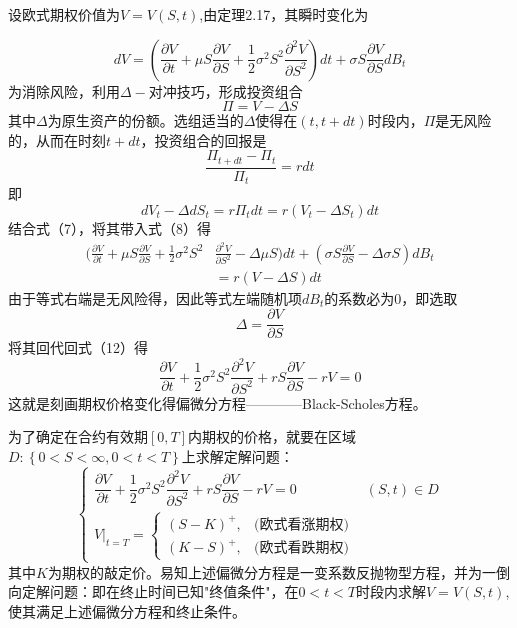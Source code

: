 \documentclass[UTF8，12pt]{ctexart}
\numberwithin{equation}{section}
\begin{document}
设欧式期权价值为$V=V(S,t)$,由定理2.17，其瞬时变化为

\begin{equation}
	dV=(\frac{\partial V}{\partial t}+\mu S\frac{\partial V}{\partial S}+\frac{1}{2}\sigma^2 S^2\frac{\partial^2 V}{\partial S^2})dt+\sigma S\frac{\partial V}{\partial S}dB_t
\end{equation}
为消除风险，利用$\Delta-$对冲技巧，形成投资组合
\begin{equation}
	\Pi=V-\Delta S
\end{equation}
其中$\Delta$为原生资产的份额。选组适当的$\Delta$使得在$(t,t+dt)$时段内，$\Pi$是无风险的，从而在时刻$t+dt$，投资组合的回报是
\begin{equation}
	\frac{\Pi_{t+dt}-\Pi_t}{\Pi_t}=rdt
\end{equation}
即
\begin{equation}
	dV_t-\Delta dS_t=r\Pi_t dt=r(V_t-\Delta S_t)dt
\end{equation}
结合式（7），将其带入式（8）得
\begin{equation}
	\begin{split}
		(\frac{\partial V}{\partial t}+\mu S\frac{\partial V}{\partial S}+\frac{1}{2}\sigma^2 S^2&\frac{\partial^2 V}{\partial S^2}-\Delta\mu S)dt+(\sigma S\frac{\partial V}{\partial S}-\Delta\sigma S)dB_t\\
		&=r(V-\Delta S)dt
	\end{split}
\end{equation}
由于等式右端是无风险得，因此等式左端随机项$dB_t$的系数必为0，即选取
\begin{equation}
	\Delta=\frac{\partial V}{\partial S}
\end{equation}
将其回代回式（12）得
\begin{equation}
	\frac{\partial V}{\partial t}+\frac{1}{2}\sigma^2 S^2\frac{\partial^2 V}{\partial S^2}+rS\frac{\partial V}{\partial S}-rV=0
\end{equation}
这就是刻画期权价格变化得偏微分方程————Black-Scholes方程。

为了确定在合约有效期$[0,T]$内期权的价格，就要在区域$D:\left\{0<S<\infty,0<t<T\right\}$上求解定解问题：
\[
\begin{cases}
	\dfrac{\partial V}{\partial t} + \dfrac{1}{2}\sigma^2 S^2 \dfrac{\partial^2 V}{\partial S^2} + rS \dfrac{\partial V}{\partial S} - rV = 0 & (S,t)\in D \\[10pt]
	V|_{t=T} = 
	\begin{cases}
		(S - K)^+, & \text{(欧式看涨期权)} \\
		(K - S)^+, & \text{(欧式看跌期权)}
	\end{cases}
\end{cases}
\]
其中$K$为期权的敲定价。易知上述偏微分方程是一变系数反抛物型方程，并为一倒向定解问题：即在终止时间已知"终值条件"，在$0<t<T$时段内求解$V=V(S,t)$,使其满足上述偏微分方程和终止条件。
\end{document}
